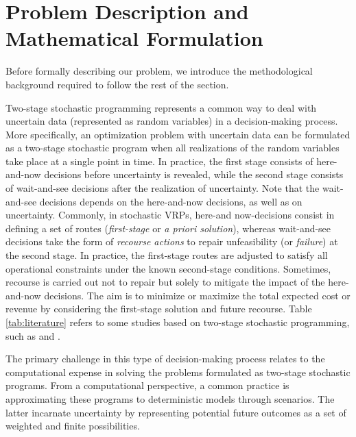 \documentclass[authoryear,preprint,12pt]{elsarticle}
\begin{document}
\section{Problem Description and Mathematical Formulation} \label{problem}

Before formally describing our problem, we introduce the methodological background required to follow the rest of the section. 

Two-stage stochastic programming represents a common way to deal with uncertain data (represented as random variables) in a
decision-making process. More specifically, an optimization problem with uncertain data can be formulated as a two-stage stochastic program when all realizations of the random variables take place at a single
point in time. In practice, the first stage consists of here-and-now decisions before uncertainty is revealed, while the second stage consists of wait-and-see decisions after the realization of uncertainty. Note that the wait-and-see decisions depends on the here-and-now decisions, as well as on uncertainty. Commonly, in stochastic VRPs, here-and now-decisions consist in defining a set of routes (\textit{first-stage} or \textit{a priori solution}), whereas wait-and-see decisions take the form of \textit{recourse actions} to repair unfeasibility (or \textit{failure}) at the second stage. In practice, the first-stage routes are adjusted to satisfy all operational constraints under the known second-stage conditions. Sometimes, recourse is carried out not to repair but solely to mitigate the impact of the here-and-now decisions. The aim is to minimize or maximize the total expected cost or revenue by considering
the first-stage solution and future recourse. Table \ref{tab:literature} refers to some studies based on two-stage stochastic programming, such as \cite{Laporte2010} and \cite{Nolz2014}. 

The
primary challenge in this type of decision-making process relates to the computational expense in solving the problems formulated as two-stage stochastic programs.
From a computational perspective, a common practice  is approximating these programs to deterministic models through scenarios. The latter incarnate uncertainty by representing potential future outcomes as a set of weighted and finite possibilities.  
\end{document}
